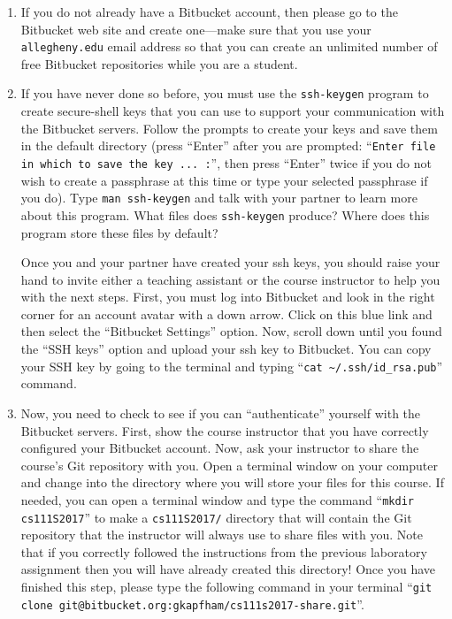 \begin{enumerate}

  \item If you do not already have a Bitbucket account, then please go to the Bitbucket web site and create one---make
    sure that you use your {\tt allegheny.edu} email address so that you can create an unlimited number of free
    Bitbucket repositories while you are a student.

  \item If you have never done so before, you must use the {\tt ssh-keygen} program to create secure-shell keys that you
    can use to support your communication with the Bitbucket servers. Follow the prompts to create your keys and save
    them in the default directory (press ``Enter'' after you are prompted: ``{\tt Enter file in which to save the key
    ...  :}'', then press ``Enter'' twice if you do not wish to create a passphrase at this time or type your selected
    passphrase if you do). Type {\tt man ssh-keygen} and talk with your partner to learn more about this program. What
    files does {\tt ssh-keygen} produce? Where does this program store these files by default?

    Once you and your partner have created your ssh keys, you should raise your hand to invite either a teaching
    assistant or the course instructor to help you with the next steps. First, you must log into Bitbucket and look in
    the right corner for an account avatar with a down arrow. Click on this blue link and then select the ``Bitbucket
    Settings'' option. Now, scroll down until you found the ``SSH keys'' option and upload your ssh key to Bitbucket.
    You can copy your SSH key by going to the terminal and typing ``{\tt cat \textasciitilde{}/.ssh/id\_rsa.pub}''
    command.

  \item Now, you need to check to see if you can ``authenticate'' yourself with the Bitbucket servers. First, show the
    course instructor that you have correctly configured your Bitbucket account. Now, ask your instructor to share the
    course's Git repository with you. Open a terminal window on your computer and change into the directory where you
    will store your files for this course. If needed, you can open a terminal window and type the command ``{\tt mkdir
    cs111S2017}'' to make a {\tt cs111S2017/} directory that will contain the Git repository that the instructor will
    always use to share files with you. Note that if you correctly followed the instructions from the previous
    laboratory assignment then you will have already created this directory! Once you have finished this step, please
    type the following command in your terminal ``{\tt git clone git@bitbucket.org:gkapfham/cs111s2017-share.git}''.


\end{enumerate}
